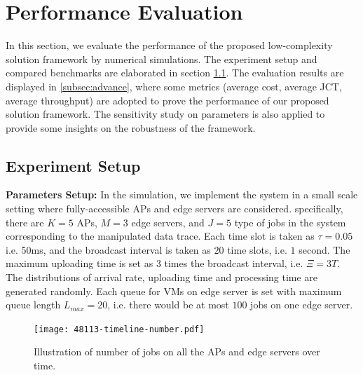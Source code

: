 \section{Performance Evaluation}
\label{sec:evaluation}
In this section, we evaluate the performance of the proposed low-complexity solution framework by numerical simulations.
The experiment setup and compared benchmarks are elaborated in section \ref{subsec:basic}.
The evaluation results are displayed in \ref{subsec:advance}, where some metrics (average cost, average JCT, average throughput) are adopted to prove the performance of our proposed solution framework.
The sensitivity study on parameters is also applied to provide some insights on the robustness of the framework.

\subsection{Experiment Setup}
\label{subsec:basic}
\textbf{Parameters Setup:}
In the simulation, we implement the system in a small scale setting where fully-accessible APs and edge servers are considered.
specifically, there are $K=5$ APs, $M=3$ edge servers, and $J=5$ type of jobs in the system corresponding to the manipulated data trace.
Each time slot is taken as $\tau = 0.05$ i.e. 50ms, and the broadcast interval is taken as $20$ time slots, i.e. $1$ second.
The maximum uploading time is set as $3$ times the broadcast interval, i.e. $\Xi = 3T$.
The distributions of arrival rate, uploading time and processing time are generated randomly.
Each queue for VMs on edge server is set with maximum queue length $L_{max}=20$, i.e. there would be at most $100$ jobs on one edge server.

\begin{figure}[ht!]                                                                            %
    \centering                                                                                  %
    \texttt{[image: 48113-timeline-number.pdf]}                           %
    \caption{Illustration of number of jobs on all the APs and edge servers over time.}     %
    \label{fig:general_timeline}                                                                %
\end{figure}                                                                                   %

